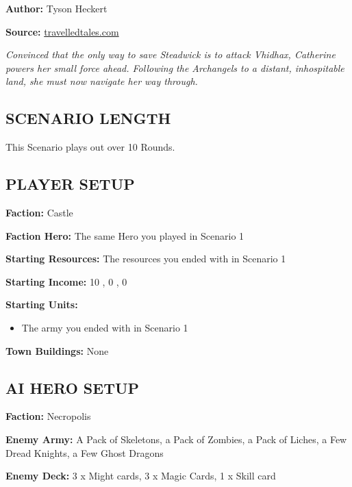 
\begin{multicols*}{2}

\textbf{Author:} Tyson Heckert

\textbf{Source:} \href{https://travelledtales.com}{travelledtales.com}

\textit{Convinced that the only way to save Steadwick is to attack Vhidhax, Catherine powers her small force ahead. 
Following the Archangels to a distant, inhospitable land, she must now navigate her way through.}

\subsection*{\MakeUppercase{Scenario length}}

This Scenario plays out over 10 Rounds.

\subsection*{\MakeUppercase{Player setup}}

\textbf{Faction:} Castle

\textbf{Faction Hero:} The same Hero you played in Scenario 1

\textbf{Starting Resources:} The resources you ended with in Scenario 1

\textbf{Starting Income:} 10 , 0 , 0 

\textbf{Starting Units:}
\begin{itemize}
  \item The army you ended with in Scenario 1
\end{itemize}

\textbf{Town Buildings:} None

\subsection*{\MakeUppercase{AI Hero setup}}

\textbf{Faction:} Necropolis

\textbf{Enemy Army:} A Pack of Skeletons, a Pack of Zombies, a Pack of Liches, a Few Dread Knights, a Few Ghost Dragons

\textbf{Enemy Deck:} 3 x Might cards, 3 x Magic Cards, 1 x Skill card


\end{multicols*}
